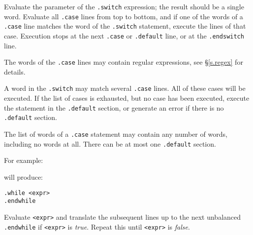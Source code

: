 \begin{desc}
Evaluate the parameter of the \verb'.switch' expression; the result
should be a single word. Evaluate all \verb'.case' lines from top
to bottom, and if one of the words of a \verb'.case' line matches
the word of the \verb'.switch' statement, execute the lines of that case.
Execution stops at the next \verb'.case' or \verb'.default' line,
or at the \verb'.endswitch' line.

The words of the \verb'.case' lines may contain regular
expressions, see \S\ref{s.regex} for details.

A word in the \verb'.switch' may match several \verb'.case'
lines. All of these cases will be executed.
If the list of cases is exhausted, but no case has been executed,
execute the statement in the \texttt{.default} section, or generate
an error if there is no \texttt{.default} section.

The list of words of a \verb'.case' statement may contain any number of words,
including no words at all. There can be at most one \verb'.default'
section.

For example:
\begin{showfile}

\end{showfile}
will produce:
\begin{showfile}

\end{showfile}
\end{desc}
\begin{verbatim}
.while <expr>
.endwhile
\end{verbatim}
\begin{desc}
Evaluate \texttt{<expr>} and translate the subsequent lines up to the next
unbalanced \texttt{.endwhile} if \texttt{<expr>} is \textit{true}.
Repeat this until \texttt{<expr>} is \textit{false}.
\end{desc}

